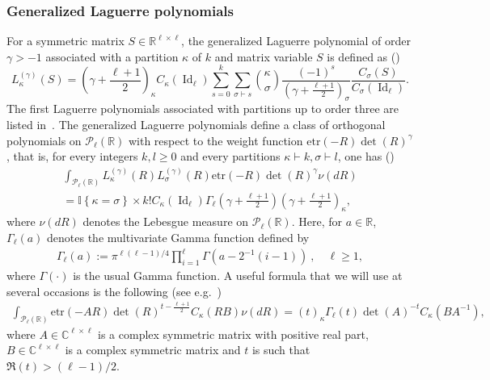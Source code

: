 \documentclass[10pt]{amsart}
\theoremstyle{definition}\newtheorem{defi}[theo]{Definition}\newtheorem{rema}[theo]{Remark}\newtheorem{exam}[theo]{Example}\newtheorem{exem}[theo]{Example}\newtheorem{nota}[theo]{Notation}
\DeclareMathOperator{\Id}{Id}
\newcommand{\clP}{\mathcal{P}}
\newcommand{\R}{\mathbb{R}}
\newcommand{\C}{\mathbb{C}}
\newcommand{\ind}[1]{\mathbb{I}
\left\{#1\right\}}
\newcommand{\etr}[1]{\mathrm{etr}\left(#1\right)}
\begin{document}
\subsubsection*{Generalized Laguerre polynomials}
For a symmetric matrix $S \in \R^{\ell \times \ell}$, the generalized Laguerre polynomial of order $\gamma>-1$ associated with a partition $\kappa$ of $k$ and matrix variable $S$ is defined as (\cite[Eq.~(4.6.5)]{BFZP})
\begin{equation}\label{LagZon}
L_{\kappa}^{(\gamma)}(S) = \left(\gamma+\frac{\ell+1}{2}\right)_{\kappa} C_{\kappa}(\Id_{\ell})
\sum_{s=0}^{k} \sum_{\sigma \vdash s} \binom{\kappa}{\sigma} \frac{(-1)^s}{\left(\gamma+\frac{\ell+1}{2}\right)_{\sigma}}\frac{C_{\sigma}(S)}{C_{\sigma}(\Id_{\ell})}.
\end{equation}
The first Laguerre polynomials associated with partitions up to order three are listed in~\cite[Eq.~(4.6.8)]{BFZP}. The generalized Laguerre polynomials define a class of orthogonal polynomials on $\clP_{\ell}(\R)$ with respect to the weight function $\etr{-R}\det(R)^{\gamma}$, that is, for every integers $k,l\geq0$ and every partitions $\kappa \vdash k, \sigma \vdash l$, one has (\cite[Theorem~4.6.4]{BFZP})
\begin{multline}\label{LagOrt}
\int_{\clP_{\ell}(\R)} L_{\kappa}^{(\gamma)}(R) L_{\sigma}^{(\gamma)}(R) \etr{-R}\det(R)^{\gamma} \nu(dR) \\
= \ind{\kappa=\sigma} \times k! C_{\kappa}(\Id_{\ell})
\Gamma_{\ell}\left(\gamma+\frac{\ell+1}{2}\right) \left(\gamma+\frac{\ell+1}{2}\right)_{\kappa},
\end{multline}
where $\nu(dR)$ denotes the Lebesgue measure on $\clP_{\ell}(\R)$. Here, for $a \in \R$, $\Gamma_{\ell}(a)$ denotes the multivariate Gamma function defined by
\begin{gather*}
\Gamma_{\ell}(a):= \pi^{\ell(\ell-1)/4} \prod_{i=1}^{\ell} \Gamma\left(a -2^{-1}(i-1)\right) \ , \quad \ell \geq 1,
\end{gather*}
where $\Gamma(\cdot)$ is the usual Gamma function. A useful formula that we will use at several occasions is the following (see e.g.~\cite[Theorem~4.4.1]{BFZP})
\begin{gather}\label{intzonal}
\int_{\clP_{\ell}(\R)}
\etr{-AR}\det(R)^{t-\frac{\ell+1}{2}}C_{\kappa}(RB) \nu(dR) = (t)_{\kappa} \Gamma_{\ell}(t) \det(A)^{-t}C_{\kappa}\left(BA^{-1}\right),
\end{gather}
where $A\in \C^{\ell \times \ell}$ is a complex symmetric matrix with positive real part, $B\in \C^{\ell \times \ell}$ is a complex symmetric matrix and $t$ is such that $\Re(t)>(\ell-1)/2$.
\end{document}
